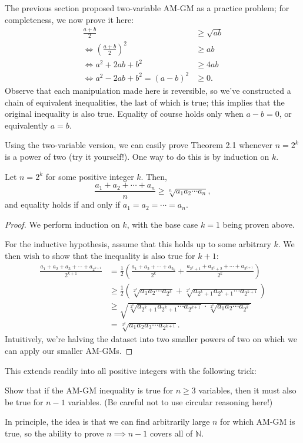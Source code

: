 \documentclass{scrartcl}
\providecommand{\half}{\frac{1}{2}}
\providecommand{\NN}{\mathbb N}
\begin{document}
The previous section proposed two-variable AM-GM as a practice problem;
for completeness, we now prove it here:
\begin{align*}
	\frac{a+b}{2} &\ge \sqrt{ab}\\
	\iff \left(\frac{a+b}{2}\right)^2 &\ge ab\\
	\iff a^2 + 2ab + b^2 &\ge 4ab\\
	\iff a^2 - 2ab + b^2 = (a - b)^2 &\ge 0.
\end{align*}
Observe that each manipulation made here is reversible,
so we've constructed a chain of equivalent inequalities,
the last of which is true; this implies that the original inequality is
also true.
Equality of course holds only when $a - b = 0$, or equivalently $a = b$.

Using the two-variable version, we can easily prove Theorem 2.1
whenever $n = 2^k$ is a power of two (try it yourself!).
One way to do this is by induction on $k$.

\begin{theorem*}[AM-GM on $2^k$ variables]
	Let $n = 2^k$ for some positive integer $k$. Then,
	\[\frac{a_1 + a_2 + \cdots + a_n}{n} \ge \sqrt[n]{a_1a_2\cdots a_n},\]
	and equality holds if and only if $a_1 = a_2 = \cdots = a_n$.
\end{theorem*}
\begin{proof}
	We perform induction on $k$, with the base case $k = 1$ being proven above. 
	
	For the inductive hypothesis, assume that this holds
	up to some arbitrary $k$.
	We then wish to show that the inequality is also true for $k + 1$:
	\begin{align*}
		\frac{a_1 + a_2 + a_3 + \cdots + a_{2^{k+1}}}{2^{k+1}} &=
		\half\left(\frac{a_1 + a_2 + \cdots + a_{2_k}}{2^k}
		+ \frac{a_{2^k+1} + a_{2^k+2} + \cdots + a_{2^{k+1}}}{2^k}\right)\\
		&\ge \half\left(\sqrt[2^k]{a_1a_2\cdots a_{2^k}} +
		\sqrt[2^k]{a_{2^k+1}a_{2^k+1}\cdots a_{2^{k+1}}}\right)\\
		&\ge \sqrt{\sqrt[2^k]{a_{2^k+1}a_{2^k+1}\cdots a_{2^{k+1}}}\cdot
		\sqrt[2^k]{a_1a_2\cdots a_{2^k}}}\\
		&= \sqrt[2^k]{a_{1}a_{2}a_3\cdots a_{2^{k+1}}}.
	\end{align*}
	Intuitively, we're halving the dataset into two smaller powers of two
	on which we can apply our smaller AM-GMs.
\end{proof}

This extends readily into all positive integers with the following trick:
\begin{problem}
	Show that if the AM-GM inequality is true for $n \ge 3$ variables,
	then it must also be true for $n - 1$ variables.
	(Be careful not to use circular reasoning here!)
\end{problem}
In principle, the idea is that we can find arbitrarily large $n$
for which AM-GM is true, so the ability to prove $n\implies n - 1$
covers all of $\NN$. 
\end{document}
